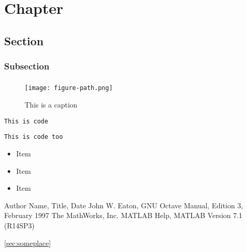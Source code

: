 
\chapter{Chapter}
\section{Section}
\subsection{Subsection}

\paragraph{}
\paragraph{}
\paragraph{} %


\begin{figure}[H]
\centering
\texttt{[image: figure-path.png]}
\caption{This is a caption}
\end{figure}


\lstinline{This is code}


\begin{lstlisting}
This is code too
\end{lstlisting}


\begin{itemize}
    \item Item
    \item Item
    \item Item %
\end{itemize}

\begin{thebibliography}{99}
 Author Name, Title, Date
 John W. Eaton, GNU Octave Manual, Edition 3, February 1997
 The MathWorks, Inc.
MATLAB Help, MATLAB Version 7.1 (R14SP3)
\end{thebibliography}

\cite{1}


\label{sec:someplace}
\ref{sec:someplace}
